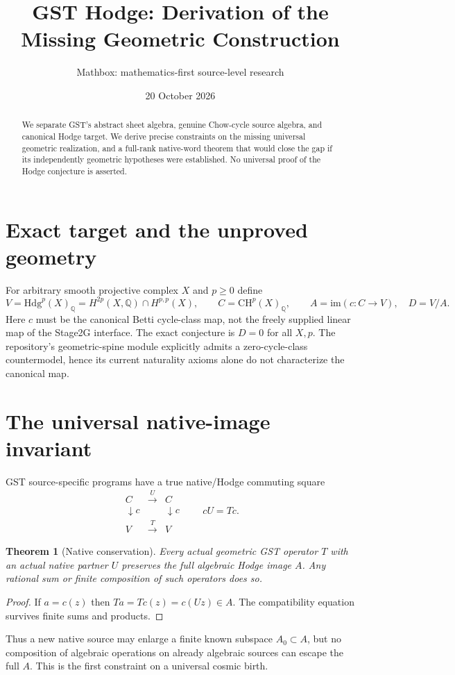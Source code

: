 \documentclass[11pt]{article}
\title{GST Hodge: Derivation of the Missing Geometric Construction}
\author{Mathbox: mathematics-first source-level research}
\date{20 October 2026}
\newcommand{\Q}{\mathbb Q}
\newcommand{\CH}{\mathrm{CH}}
\newcommand{\Hdg}{\mathrm{Hdg}}
\newcommand{\im}{\mathrm{im}}
\newtheorem{theorem}{Theorem}
\begin{document}
\maketitle
\begin{abstract}
We separate GST's abstract sheet algebra, genuine Chow-cycle source
algebra, and canonical Hodge target. We derive precise constraints on
the missing universal geometric realization, and a full-rank
native-word theorem that would close the gap if its independently
geometric hypotheses were established. No universal proof of the
Hodge conjecture is asserted.
\end{abstract}
\section{Exact target and the unproved geometry}
For arbitrary smooth projective complex $X$ and $p\ge0$ define
\[
 V=\Hdg^p(X)_{\Q}
 =H^{2p}(X,\Q)\cap H^{p,p}(X),\qquad
 C=\CH^p(X)_{\Q},\qquad
 A=\im(c:C\to V),\quad D=V/A.
\]
Here $c$ must be the canonical Betti cycle-class map, not
the freely supplied linear map of the Stage2G interface.
The exact conjecture is $D=0$ for all $X,p$.
The repository's geometric-spine module explicitly admits
a zero-cycle-class countermodel, hence its current
naturality axioms alone do not characterize the canonical map.

\section{The universal native-image invariant}
GST source-specific programs have a true native/Hodge
commuting square
\[
\begin{array}{ccc}
 C&\stackrel{U}{\longrightarrow}&C\\
 \downarrow c&&\downarrow c\\
 V&\stackrel{T}{\longrightarrow}&V
\end{array}
\qquad cU=Tc .
\]
\begin{theorem}[Native conservation]
Every actual geometric GST operator $T$ with an actual native
partner $U$ preserves the full algebraic Hodge image $A$.
Any rational sum or finite composition of such operators does so.
\end{theorem}
\begin{proof}
If $a=c(z)$ then $Ta=Tc(z)=c(Uz)\in A$.
The compatibility equation survives finite sums and products.
\end{proof}
Thus a new native source may enlarge a finite known subspace
$A_0\subset A$, but no composition of algebraic operations
on already algebraic sources can escape the full $A$.
This is the first constraint on a universal cosmic birth.
\end{document}
